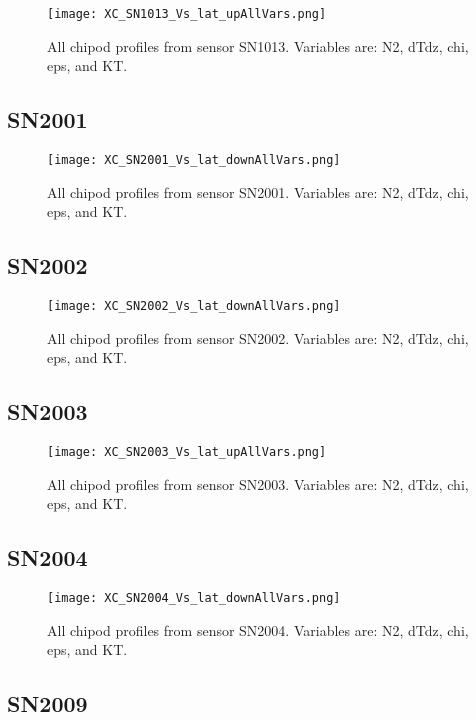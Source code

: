 \documentclass[11pt]{article}
\begin{document}
\begin{figure}[htbp]
\texttt{[image: XC\_SN1013\_Vs\_lat\_upAllVars.png]}
\caption{All chipod profiles from sensor SN1013. Variables are: N2, dTdz, chi, eps, and KT.}
\label{}
\end{figure}

\subsection{SN2001}
\begin{figure}[htbp]
\texttt{[image: XC\_SN2001\_Vs\_lat\_downAllVars.png]}
\caption{All chipod profiles from sensor SN2001. Variables are: N2, dTdz, chi, eps, and KT.}
\label{}
\end{figure}

\subsection{SN2002}

\begin{figure}[htbp]
\texttt{[image: XC\_SN2002\_Vs\_lat\_downAllVars.png]}
\caption{All chipod profiles from sensor SN2002. Variables are: N2, dTdz, chi, eps, and KT.}
\label{}
\end{figure}

\subsection{SN2003}

\begin{figure}[htbp]
\texttt{[image: XC\_SN2003\_Vs\_lat\_upAllVars.png]}
\caption{All chipod profiles from sensor SN2003. Variables are: N2, dTdz, chi, eps, and KT.}
\label{}
\end{figure}

\subsection{SN2004}

\begin{figure}[htbp]
\texttt{[image: XC\_SN2004\_Vs\_lat\_downAllVars.png]}
\caption{All chipod profiles from sensor SN2004. Variables are: N2, dTdz, chi, eps, and KT.}
\label{}
\end{figure}

\subsection{SN2009}
\end{document}

